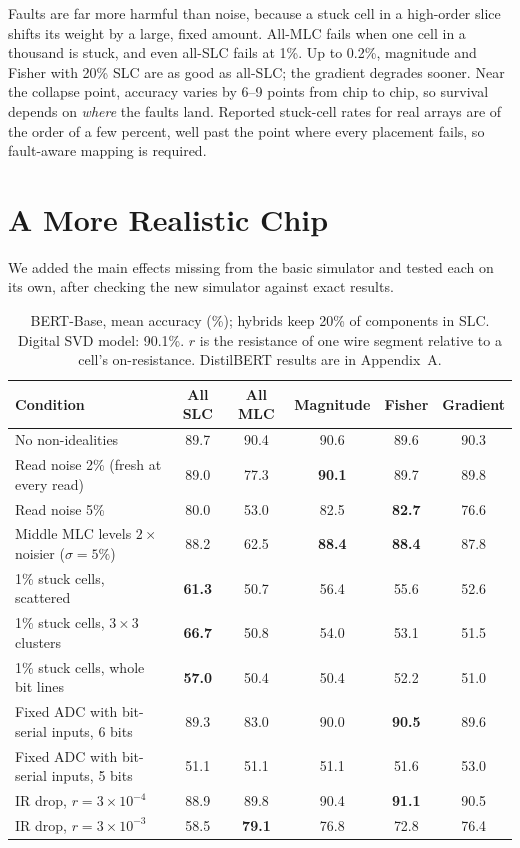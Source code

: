 \documentclass[10pt,a4paper]{article}
\newcommand{\best}[1]{\textcolor{cmag}{\textbf{#1}}}
\begin{document}
Faults are far more harmful than noise, because a stuck cell in a high-order slice shifts its weight by a
large, fixed amount. All-MLC fails when one cell in a thousand is stuck, and even all-SLC fails at 1\%. Up
to 0.2\%, magnitude and Fisher with 20\% SLC are as good as all-SLC; the gradient degrades sooner. Near
the collapse point, accuracy varies by 6--9 points from chip to chip, so survival depends on \emph{where}
the faults land. Reported stuck-cell rates for real arrays are of the order of a few percent, well past
the point where every placement fails, so fault-aware mapping is required.

\section{A More Realistic Chip}
We added the main effects missing from the basic simulator and tested each on its own, after checking the
new simulator against exact results.

\begin{table}[h]
\centering\small
\begin{tabular}{@{}lccccc@{}}
\toprule
Condition & All SLC & All MLC & Magnitude & Fisher & Gradient \\
\midrule
No non-idealities & 89.7 & 90.4 & 90.6 & 89.6 & 90.3 \\
Read noise 2\% (fresh at every read) & 89.0 & 77.3 & \best{90.1} & 89.7 & 89.8 \\
Read noise 5\% & 80.0 & 53.0 & 82.5 & \best{82.7} & 76.6 \\
Middle MLC levels $2\times$ noisier ($\sigma=5\%$) & 88.2 & 62.5 & \best{88.4} & \best{88.4} & 87.8 \\
1\% stuck cells, scattered & \best{61.3} & 50.7 & 56.4 & 55.6 & 52.6 \\
1\% stuck cells, $3\times3$ clusters & \best{66.7} & 50.8 & 54.0 & 53.1 & 51.5 \\
1\% stuck cells, whole bit lines & \best{57.0} & 50.4 & 50.4 & 52.2 & 51.0 \\
Fixed ADC with bit-serial inputs, 6 bits & 89.3 & 83.0 & 90.0 & \best{90.5} & 89.6 \\
Fixed ADC with bit-serial inputs, 5 bits & 51.1 & 51.1 & 51.1 & 51.6 & 53.0 \\
IR drop, $r=3\times10^{-4}$ & 88.9 & 89.8 & 90.4 & \best{91.1} & 90.5 \\
IR drop, $r=3\times10^{-3}$ & 58.5 & \best{79.1} & 76.8 & 72.8 & 76.4 \\
\bottomrule
\end{tabular}
\caption{BERT-Base, mean accuracy (\%); hybrids keep 20\% of components in SLC. Digital SVD model:
90.1\%. $r$ is the resistance of one wire segment relative to a cell's on-resistance. DistilBERT results
are in Appendix~A.}
\end{table}
\end{document}
